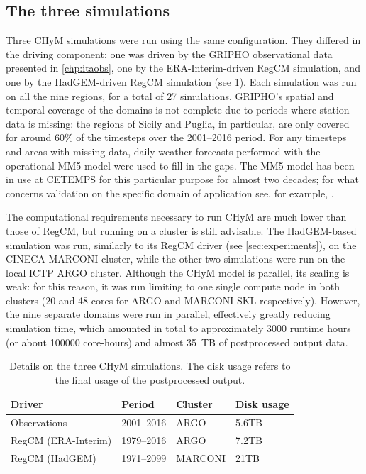 \subsection{The three simulations}
Three CHyM simulations were run using the same configuration. They differed in the driving component: one was driven by the GRIPHO observational data presented in \cref{chp:itaobs}, one by the ERA-Interim-driven RegCM simulation, and one by the HadGEM-driven RegCM simulation (see \cref{tab:chym_sims}).
Each simulation was run on all the nine regions, for a total of 27 simulations.
GRIPHO's spatial and temporal coverage of the domains is not complete due to periods where station data is missing: the regions of Sicily and Puglia, in particular, are only covered for around 60\% of the timesteps over the 2001--2016 period.
For any timesteps and areas with missing data, daily weather forecasts performed with the operational MM5 model \citep{Grell1994} were used to fill in the gaps.
The MM5 model has been in use at CETEMPS for this particular purpose for almost two decades; for what concerns validation on the specific domain of application see, for example, \citet{Bianco2006}.

The computational requirements necessary to run CHyM are much lower than those of RegCM, but running on a cluster is still advisable.
The HadGEM-based simulation was run, similarly to its RegCM driver (see \cref{sec:experiments}), on the CINECA MARCONI cluster, while the other two simulations were run on the local ICTP ARGO cluster.
Although the CHyM model is parallel, its scaling is weak: for this reason, it was run limiting to one single compute node in both clusters (20 and 48 cores for ARGO and MARCONI SKL respectively).
However, the nine separate domains were run in parallel, effectively greatly reducing simulation time, which amounted in total to approximately 3000 runtime hours (or about 100000 core-hours) and almost \SI{35}{\tera B} of postprocessed output data.
\begin{table}[]
\centering
\begin{tabular}{@{}llll@{}}
\toprule
Driver              & Period     & Cluster & Disk usage \\ \midrule
Observations        & 2001--2016 & ARGO    & 5.6TB      \\
RegCM (ERA-Interim) & 1979--2016 & ARGO    & 7.2TB      \\
RegCM (HadGEM)      & 1971--2099 & MARCONI & 21TB       \\ \bottomrule
\end{tabular}
\caption{Details on the three CHyM simulations. The disk usage refers to the final usage of the postprocessed output.}\label{tab:chym_sims}
\end{table}

